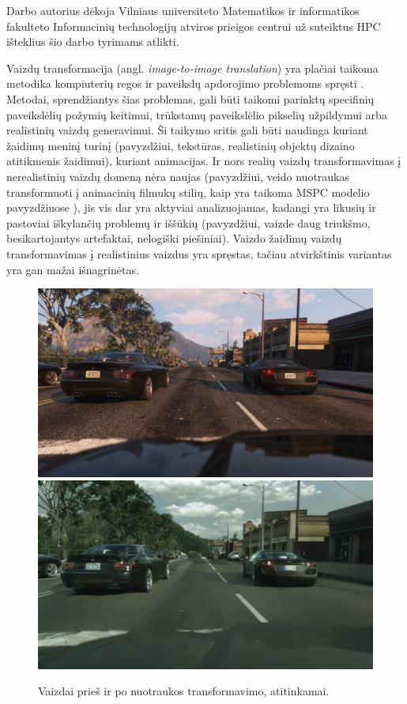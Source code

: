 \documentclass{VUMIFPSbakalaurinis}
\begin{document}
    Darbo autorius dėkoja Vilniaus universiteto Matematikos ir informatikos fakulteto Informacinių technologijų atviros prieigos centrui už suteiktus HPC išteklius šio darbo tyrimams atlikti. 

    Vaizdų transformacija (angl. \emph{image-to-image  translation}) yra plačiai taikoma metodika kompiuterių regos ir paveikslų apdorojimo problemoms spręsti \cite{ImTImTr}. Metodai, sprendžiantys šias problemas, gali būti taikomi parinktų specifinių paveikslėlių požymių keitimui, trūkstamų paveikslėlio pikselių užpildymui arba realistinių vaizdų generavimui. Ši taikymo sritis gali būti naudinga kuriant žaidimų meninį turinį (pavyzdžiui, tekstūras, realistinių objektų dizaino atitikmenis žaidimui), kuriant animacijas. Ir nors realių vaizdų transformavimas į nerealistinių vaizdų domeną nėra naujas (pavyzdžiui, veido nuotraukas transformuoti į animacinių filmukų stilių, kaip yra taikoma MSPC modelio pavyzdžiuose \cite{Mspc}), jis vis dar yra aktyviai analizuojamas, kadangi yra likusių ir pastoviai iškylančių problemų ir iššūkių (pavyzdžiui, vaizde daug triukšmo, besikartojantys artefaktai, nelogiški piešiniai). Vaizdo žaidimų vaizdų transformavimas į realistinius vaizdus yra spręstas, tačiau atvirkštinis variantas yra gan mažai išnagrinėtas.

    \begin{figure}[H]
        \centering
        \includegraphics[scale=0.3]{img/EnPhEn_before}
        \includegraphics[scale=0.3]{img/EnPhEn_after}
        \caption{Vaizdai prieš ir po nuotraukos transformavimo, atitinkamai.\cite{EnPhEn}}
        \label{img:EnPhEn}
    \end{figure}
    
\end{document}
